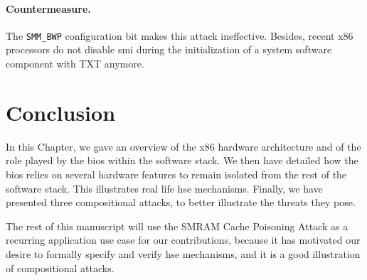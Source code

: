 \paragraph{Countermeasure.}
%
The \texttt{SMM\_BWP} configuration bit makes this attack ineffective.
%
Besides, recent x86 processors do not disable \ac{smi} during the initialization
of a system software component with TXT anymore.

\section{Conclusion}
\label{sec:usecase:conclusion}

In this Chapter, we gave an overview of the x86 hardware architecture and of the
role played by the \ac{bios} within the software stack.
%
We then have detailed how the \ac{bios} relies on several hardware features to
remain isolated from the rest of the software stack. This illustrates real life
\ac{hse} mechanisms.
%
Finally, we have presented three compositional attacks, to better illustrate
the threats they pose.

The rest of this manuscript will use the SMRAM Cache Poisoning Attack as a
recurring application use case for our contributions, because it has motivated
our desire to formally specify and verify \ac{hse} mechanisms, and it is a good
illustration of compositional attacks.
